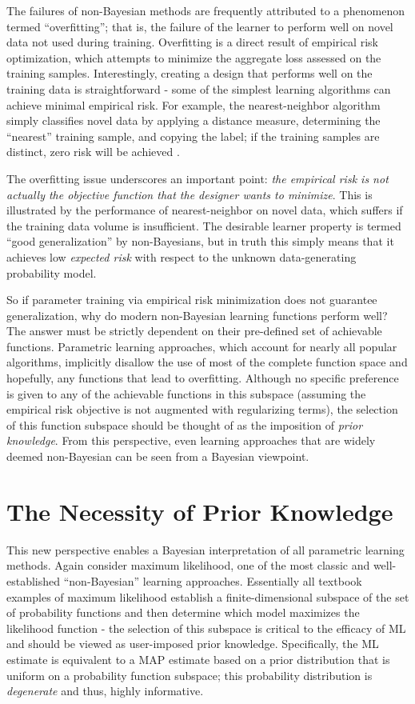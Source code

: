 \documentclass[12pt]{report}
\begin{document}
The failures of non-Bayesian methods are frequently attributed to a phenomenon termed ``overfitting''; that is, the failure of the learner to perform well on novel data not used during training. Overfitting is a direct result of empirical risk optimization, which attempts to minimize the aggregate loss assessed on the training samples. Interestingly, creating a design that performs well on the training data is straightforward - some of the simplest learning algorithms can achieve minimal empirical risk. For example, the nearest-neighbor algorithm simply classifies novel data by applying a distance measure, determining the ``nearest'' training sample, and copying the label; if the training samples are distinct, zero risk will be achieved \cite{devroye}. 

The overfitting issue underscores an important point: \emph{the empirical risk is not actually the objective function that the designer wants to minimize}. This is illustrated by the performance of nearest-neighbor on novel data, which suffers if the training data volume is insufficient. The desirable learner property is termed ``good generalization'' by non-Bayesians, but in truth this simply means that it achieves low \emph{expected risk} with respect to the unknown data-generating probability model. 

So if parameter training via empirical risk minimization does not guarantee generalization, why do modern non-Bayesian learning functions perform well? The answer must be strictly dependent on their pre-defined set of achievable functions. Parametric learning approaches, which account for nearly all popular algorithms, implicitly disallow the use of most of the complete function space and hopefully, any functions that lead to overfitting. Although no specific preference is given to any of the achievable functions in this subspace (assuming the empirical risk objective is not augmented with regularizing terms), the selection of this function subspace should be thought of as the imposition of \emph{prior knowledge}. From this perspective, even learning approaches that are widely deemed non-Bayesian can be seen from a Bayesian viewpoint.


\section{The Necessity of Prior Knowledge}

This new perspective enables a Bayesian interpretation of all parametric learning methods. Again consider maximum likelihood, one of the most classic and well-established ``non-Bayesian'' learning approaches. Essentially all textbook examples of maximum likelihood establish a finite-dimensional subspace of the set of probability functions and then determine which model maximizes the likelihood function \cite{papoulis} - the selection of this subspace is critical to the efficacy of ML and should be viewed as user-imposed prior knowledge. Specifically, the ML estimate is equivalent to a MAP estimate based on a prior distribution that is uniform on a probability function subspace; this probability distribution is \emph{degenerate} and thus, highly informative.
\end{document}
